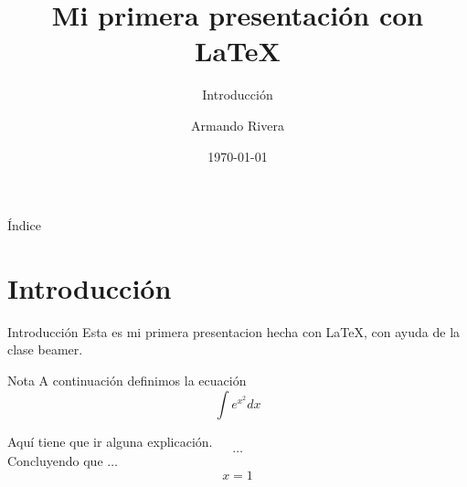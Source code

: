 \documentclass{beamer}
\author{Armando Rivera}
\date{\today}
\title{Mi primera presentación con \LaTeX}
\subtitle{Introducción}
\institute[UNAM]{Universidad Nacional Autónoma de México\\Facultad de Ingenieía}
\begin{document}
\begin{frame}
	\maketitle
\end{frame}
	\begin{frame}{Índice}
		\tableofcontents
	\end{frame}
	\section{Introducción}
	\begin{frame}[c]{Introducción}
		Esta es mi primera presentacion hecha con \LaTeX, con ayuda de la clase beamer.
	\end{frame}
	\begin{frame}
		\begin{block}{Nota}
			A continuación definimos la ecuación $$\int e^{x^2}dx$$ \pause
		\end{block}
		Aquí tiene que ir alguna explicación. \pause $$\dots$$ Concluyendo que $\dots$ \pause $$x=1$$
	\end{frame}
	
	
\end{document}
